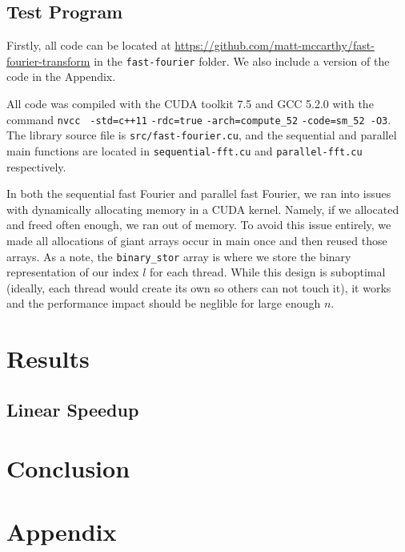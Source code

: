 \documentclass[notitlepage, twocolumn]{article}
\begin{document}
\subsection{Test Program}

Firstly, all code can be located at \url{https://github.com/matt-mccarthy/fast-fourier-transform} in the \verb|fast-fourier| folder.
We also include a version of the code in the Appendix.

All code was compiled with the CUDA toolkit 7.5 and GCC 5.2.0 with the command \verb|nvcc| \verb| -std=c++11| \verb|-rdc=true| \verb|-arch=compute_52| \verb|-code=sm_52 -O3|.
The library source file is \verb|src/fast-fourier.cu|, and the sequential and parallel main functions are located in \verb|sequential-fft.cu| and \verb|parallel-fft.cu| respectively.

In both the sequential fast Fourier and parallel fast Fourier, we ran into issues with dynamically allocating memory in a CUDA kernel.
Namely, if we allocated and freed often enough, we ran out of memory.
To avoid this issue entirely, we made all allocations of giant arrays occur in main once and then reused those arrays.
As a note, the \verb|binary_stor| array is where we store the binary representation of our index $l$ for each thread.
While this design is suboptimal (ideally, each thread would create its own so others can not touch it), it works and the performance impact should be neglible for large enough $n$.

\section{Results}

\subsection{Linear Speedup}

\section{Conclusion}

\section*{Appendix}
\end{document}
